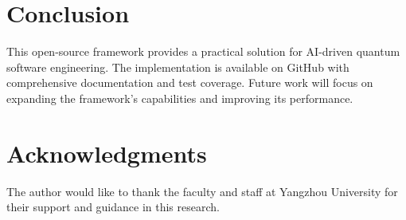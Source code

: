 \documentclass[10pt,twocolumn]{article}
\begin{document}
\section{Conclusion}
This open-source framework provides a practical solution for AI-driven quantum software engineering. The implementation is available on GitHub with comprehensive documentation and test coverage. Future work will focus on expanding the framework's capabilities and improving its performance.

\section*{Acknowledgments}
The author would like to thank the faculty and staff at Yangzhou University for their support and guidance in this research.
\end{document}
